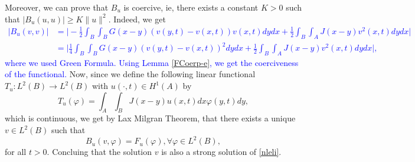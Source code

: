 \documentclass[reqno]{amsart}
\numberwithin{equation}{section}
\begin{document}
Moreover, we can prove that $B_u$ is coercive, ie, there exists a constant $K>0$ such that $|B_u(u,u)|\geq K\|u\|^2$. Indeed, we get
\textcolor{blue}{\begin{align}
    |B_u(v,v)|&=\bigg|-\frac{1}{2}
    \int_B\int_B G(x-y)(v(y,t)-v(x,t))v(x,t)dydx+\frac{1}{2}\int_B\int_A J(x-y)v
    ^2(x,t)dydx\bigg|\\
   &=\bigg|\frac{1}{4}
    \int_B\int_B G(x-y)(v(y,t)-v(x,t))^2dydx+\frac{1}{2}\int_B\int_A J(x-y)v
    ^2(x,t)dydx\bigg|,
\end{align}
where we used Green Formula. Using Lemma \eqref{FCoerp-e}, we get the coerciveness of the functional.} Now, since we define the following linear functional $T_u:L^2(B)\to L^2(B)$ with $u(\cdot,t)\in H^1(A)$ by 
$$T_u(\varphi)=\int_A\int_B J(x-y) u(x,t)dx\varphi(y,t)dy,$$
which is continuous, we get by Lax Milgran Theorem, that there exists a unique $v\in L^2(B)$ such that 
$$B_u(v,\varphi)=F_u(\varphi), \forall \varphi\in L^2(B),$$
for all $t>0$. Concluing that the solution $v$ is also a strong solution of \eqref{nleli}.\fi
\end{document}
